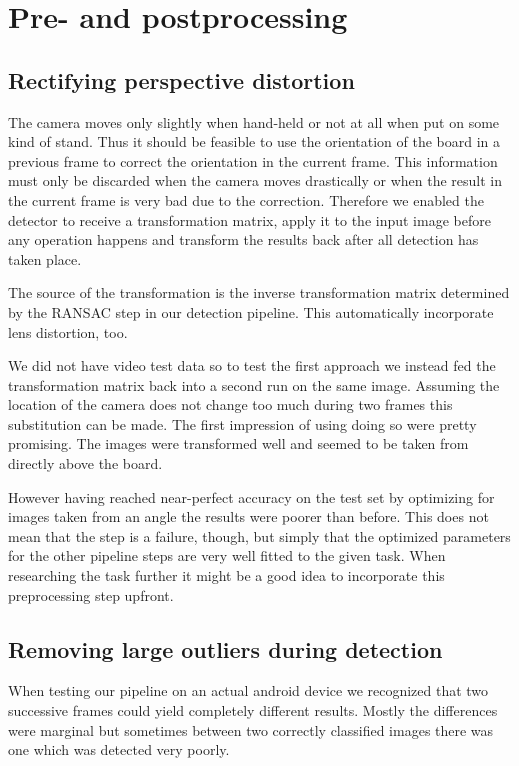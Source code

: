 	\section{Pre- and postprocessing}

	\subsection{Rectifying perspective distortion}
	The camera moves only slightly when hand-held or not at all when put on some kind of stand. Thus it should be feasible to use the orientation of the board in a previous frame to correct the orientation in the current frame. This information must only be discarded when the camera moves drastically or when the result in the current frame is very bad due to the correction. Therefore we enabled the detector to receive a transformation matrix, apply it to the input image before any operation happens and transform the results back after all detection has taken place.

	The source of the transformation is the inverse transformation matrix determined by the RANSAC step in our detection pipeline. This automatically incorporate lens distortion, too.

	We did not have video test data so to test the first approach we instead fed the transformation matrix back into a second run on the same image. Assuming the location of the camera does not change too much during two frames this substitution can be made. The first impression of using doing so were pretty promising. The images were transformed well and seemed to be taken from directly above the board.

	However having reached near-perfect accuracy on the test set by optimizing for images taken from an angle the results were poorer than before. This does not mean that the step is a failure, though, but simply that the optimized parameters for the other pipeline steps are very well fitted to the given task. When researching the task further it might be a good idea to incorporate this preprocessing step upfront.

	\subsection{Removing large outliers during detection}
	When testing our pipeline on an actual android device we recognized that two successive frames could yield completely different results. Mostly the differences were marginal but sometimes between two correctly classified images there was one which was detected very poorly.

